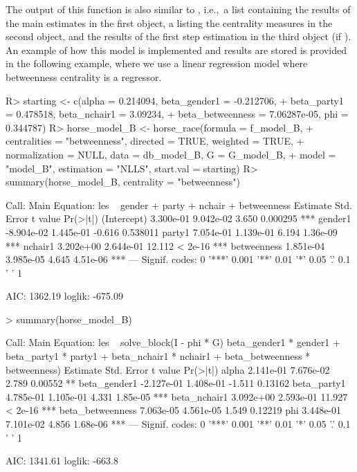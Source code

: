 \documentclass[nojss]{jss}
\begin{document}
The output of this function is also similar to , i.e.,~a list
containing the results of the main estimates in the first object, a
 listing the centrality measures in the second object, and
the results of the first step estimation in the third object (if
).  An example of how this model is implemented and
results are stored is provided in the following example, where we use a
linear regression model where betweenness centrality is a regressor.
%
\begin{CodeChunk}
\begin{CodeInput}
R> starting <- c(alpha = 0.214094, beta_gender1 = -0.212706,
+    beta_party1 = 0.478518, beta_nchair1 = 3.09234,
+    beta_betweenness = 7.06287e-05, phi = 0.344787) 
R> horse_model_B <- horse_race(formula = f_model_B, 
+    centralities = "betweenness", directed = TRUE, weighted = TRUE, 
+    normalization = NULL, data = db_model_B, G = G_model_B,
+    model = "model_B", estimation = "NLLS", start.val = starting)
R> summary(horse_model_B, centrality = "betweenness")
\end{CodeInput}
\begin{CodeOutput}
Call:
Main Equation:  les ~ gender + party + nchair + betweenness
              Estimate Std. Error t value Pr(>|t|)   
(Intercept)  3.300e-01  9.042e-02   3.650 0.000295 ***
gender1     -8.904e-02  1.445e-01  -0.616 0.538011    
party1       7.054e-01  1.139e-01   6.194 1.36e-09 ***
nchair1      3.202e+00  2.644e-01  12.112  < 2e-16 ***
betweenness  1.851e-04  3.985e-05   4.645 4.51e-06 ***
---
Signif. codes:  0 '***' 0.001 '**' 0.01 '*' 0.05 '.' 0.1 ' ' 1

AIC: 1362.19  loglik: -675.09
\end{CodeOutput}
\begin{CodeInput}
> summary(horse_model_B)
\end{CodeInput}
\begin{CodeOutput}
Call:
Main Equation: les ~ solve_block(I - phi * G) %
beta_gender1 * gender1 + beta_party1 * party1 + 
beta_nchair1 * nchair1 + beta_betweenness * betweenness)
                   Estimate Std. Error t value Pr(>|t|)    
alpha             2.141e-01  7.676e-02   2.789  0.00552 ** 
beta_gender1     -2.127e-01  1.408e-01  -1.511  0.13162    
beta_party1       4.785e-01  1.105e-01   4.331 1.85e-05 ***
beta_nchair1      3.092e+00  2.593e-01  11.927  < 2e-16 ***
beta_betweenness  7.063e-05  4.561e-05   1.549  0.12219    
phi               3.448e-01  7.101e-02   4.856 1.68e-06 ***
---
Signif. codes:  0 '***' 0.001 '**' 0.01 '*' 0.05 '.' 0.1 ' ' 1

AIC: 1341.61  loglik: -663.8
\end{CodeOutput}
\end{CodeChunk}
\end{document}
